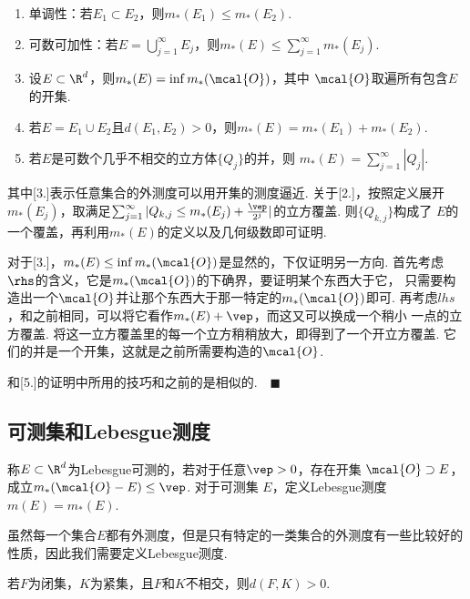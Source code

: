   \begin{thm}[外测度的性质]
    \label{thm: 外测度的性质}
    $\,$
    \begin{enumerate}
      \item 单调性：若$E_1\subset E_2$，则$m_*(E_1)\le m_*(E_2)$.
      \item 可数可加性：若$E=\bigcup_{j=1}^\infty E_j$，则$m_*(E)\le
        \sum_{j=1}^\infty m_*(E_j)$.
      \item 设$E\subset\R^d$，则$m_*(E)=\inf m_*(\mcal{O})$，其中
        $\mcal{O}$取遍所有包含$E$的开集.
      \item 若$E=E_1\cup E_2$且$d(E_1,E_2)>0$，则$m_*(E)=m_*(E_1)+m_*(E_2)$.
      \item 若$E$是可数个几乎不相交的立方体$\{Q_j\}$的并，则
        $m_*(E)=\sum_{j=1}^\infty|Q_j|$.
    \end{enumerate}
  \end{thm}
  \remark
    其中[3.]表示任意集合的外测度可以用开集的测度逼近.
  \proof
    关于[2.]，按照定义展开$m_*(E_j)$，取满足$\sum_{j=1}^\infty|Q_{k,j}
    \le m_*(E_j) + \frac{\vep}{2^j}|$的立方覆盖. 则$\{Q_{k,j}\}$构成了
    $E$的一个覆盖，再利用$m_*(E)$的定义以及几何级数即可证明.\par
    对于[3.]，$m_*(E)\le\inf m_*(\mcal{O})$是显然的，下仅证明另一方向.
    首先考虑$\rhs$的含义，它是$m_*(\mcal{O})$的下确界，要证明某个东西大于它，
    只需要构造出一个$\mcal{O}$并让那个东西大于那一特定的$m_*(\mcal{O})$即可.
    再考虑$lhs$，和之前相同，可以将它看作$m_*(E)+\vep$，而这又可以换成一个稍小
    一点的立方覆盖. 将这一立方覆盖里的每一个立方稍稍放大，即得到了一个开立方覆盖.
    它们的并是一个开集，这就是之前所需要构造的$\mcal{O}$.\par
    [4.]和[5.]的证明中所用的技巧和之前的是相似的.$\quad\blacksquare$

\subsection{可测集和Lebesgue测度}

  \begin{defi}[Lebesgue测度]
    称$E\subset\R^d$为Lebesgue可测的，若对于任意$\vep>0$，存在开集
    $\mcal{O}\supset E$，成立$m_*(\mcal{O}-E)\le\vep$. 对于可测集
    $E$，定义Lebesgue测度$m(E)=m_*(E)$.
  \end{defi}
  \remark
    虽然每一个集合$E$都有外测度，但是只有特定的一类集合的外测度有一些比较好的
    性质，因此我们需要定义Lebesgue测度.

  \begin{lemma}
    若$F$为闭集，$K$为紧集，且$F$和$K$不相交，则$d(F,K)>0$.
  \end{lemma}

